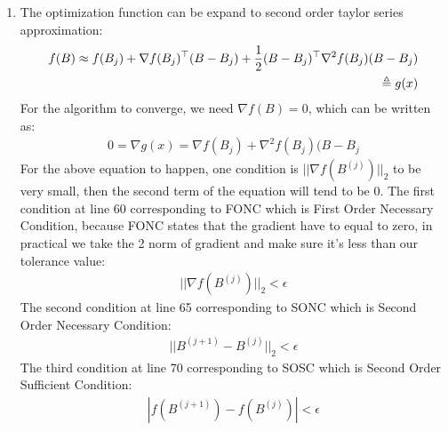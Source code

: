\documentclass[12pt,twoside]{article}
\begin{document}
\begin{enumerate}[1)]
\item
The optimization function can be expand to second order taylor series approximation:
\begin{align}
f(B) \approx f(B_j) + \nabla f(B_j)^\top(B-B_j) + \frac{1}{2}(B-B_j)^\top\nabla^2 f(B_j)(B-B_j)\\
\triangleq g(x)
\end{align}
For the algorithm to converge, we need $\nabla f(B) = 0$, which can be written as:
\begin{align}
0 = \nabla g(x) = \nabla f(B_j) + \nabla^2 f(B_j)(B-B_j
\end{align}
For the above equation to happen, one condition is $||\nabla f(B^{(j)})||_2$ to be very small, then the second term of the equation will tend to be 0.
The first condition at line 60 corresponding to FONC which is First Order Necessary Condition, because FONC states that the gradient have to equal to zero, in practical we take the 2 norm of gradient and make sure it's less than our tolerance value:
\begin{align}
||\nabla f(B^{(j)})||_2 < \epsilon
\end{align}
The second condition at line 65 corresponding to SONC which is Second Order Necessary Condition:
\begin{align}
||B^{(j+1)} - B^{(j)}||_2 < \epsilon
\end{align}
The third condition at line 70 corresponding to SOSC which is Second Order Sufficient Condition:
\begin{align}
|f(B^{(j+1)}) - f(B^{(j)})| < \epsilon
\end{align}


\end{enumerate}
\end{document}
